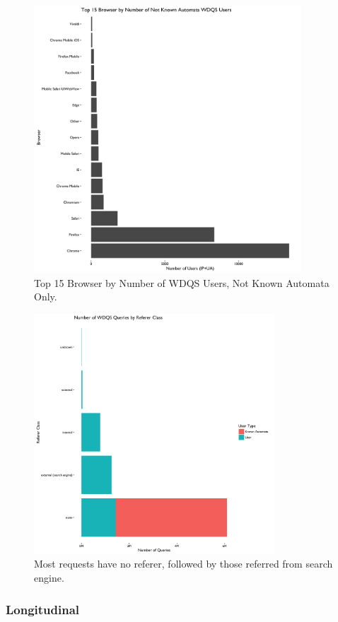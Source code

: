 \documentclass[12pt,]{article}
\begin{document}
\begin{figure}[H]
\centering
\includegraphics[width=10cm,height=10cm,keepaspectratio]{figures/n_user_by_browser.png}
\caption{Top 15 Browser by Number of WDQS Users, Not Known Automata
Only.}
\end{figure}

\begin{figure}[H]
\centering
\includegraphics[width=9cm,height=9cm,keepaspectratio]{figures/n_query_by_referer_class.png}
\caption{Most requests have no referer, followed by those referred from
search engine.}
\end{figure}

\subsubsection{Longitudinal}\label{longitudinal}
\end{document}

